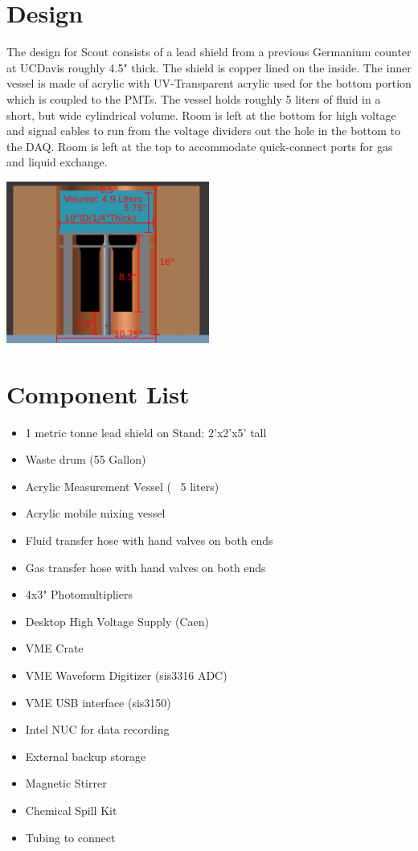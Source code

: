 \documentclass[]{article}
\begin{document}
\section{Design}
The design for Scout consists of a lead shield from a previous Germanium counter at
UCDavis roughly 4.5" thick. The shield is copper lined on the inside. The inner vessel
is made of acrylic with UV-Transparent acrylic used for the bottom portion which is
coupled to the PMTs. The vessel holds roughly 5 liters of fluid in a short, but wide
cylindrical volume.
Room is left at the bottom for high voltage and signal cables to run from the voltage
dividers out the hole in the bottom to the DAQ. Room is left at the top to
accommodate quick-connect ports for gas and liquid exchange.
\begin{center}
\includegraphics[width=0.5\textwidth]{flat_scout.png}
\end{center}

\section{Component List}
\begin{itemize}
  \item 1 metric tonne lead shield on Stand: 2'x2'x5' tall
  \item Waste drum (55 Gallon)
  \item Acrylic Measurement Vessel (~ 5 liters)
  \item Acrylic mobile mixing vessel
  \item Fluid transfer hose with hand valves on both ends
  \item Gas transfer hose with hand valves on both ends
  \item 4x3" Photomultipliers
  \item Desktop High Voltage Supply (Caen)
  \item VME Crate
  \item VME Waveform Digitizer (sis3316 ADC)
  \item VME USB interface (sis3150)
  \item Intel NUC for data recording
  \item External backup storage
  \item Magnetic Stirrer
  \item Chemical Spill Kit
  \item Tubing to connect
\end{itemize}
\end{document}
